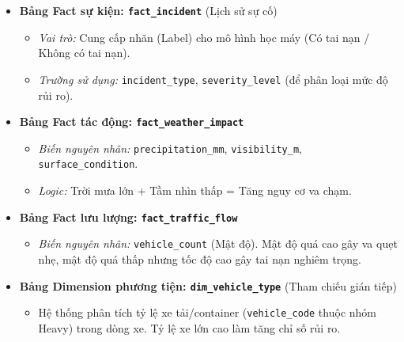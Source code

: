 \begin{itemize}
    \item \textbf{Bảng Fact sự kiện: \texttt{fact\_incident}} (Lịch sử sự cố)
    \begin{itemize}
        \item \textit{Vai trò:} Cung cấp nhãn (Label) cho mô hình học máy (Có tai nạn / Không có tai nạn).
        \item \textit{Trường sử dụng:} \texttt{incident\_type}, \texttt{severity\_level} (để phân loại mức độ rủi ro).
    \end{itemize}
    \item \textbf{Bảng Fact tác động: \texttt{fact\_weather\_impact}}
    \begin{itemize}
        \item \textit{Biến nguyên nhân:} \texttt{precipitation\_mm}, \texttt{visibility\_m}, \texttt{surface\_condition}.
        \item \textit{Logic:} Trời mưa lớn + Tầm nhìn thấp = Tăng nguy cơ va chạm.
    \end{itemize}
    \item \textbf{Bảng Fact lưu lượng: \texttt{fact\_traffic\_flow}}
    \begin{itemize}
        \item \textit{Biến nguyên nhân:} \texttt{vehicle\_count} (Mật độ). Mật độ quá cao gây va quẹt nhẹ, mật độ quá thấp nhưng tốc độ cao gây tai nạn nghiêm trọng.
    \end{itemize}
    \item \textbf{Bảng Dimension phương tiện: \texttt{dim\_vehicle\_type}} (Tham chiếu gián tiếp)
    \begin{itemize}
        \item Hệ thống phân tích tỷ lệ xe tải/container (\texttt{vehicle\_code} thuộc nhóm Heavy) trong dòng xe. Tỷ lệ xe lớn cao làm tăng chỉ số rủi ro.
    \end{itemize}
\end{itemize}

